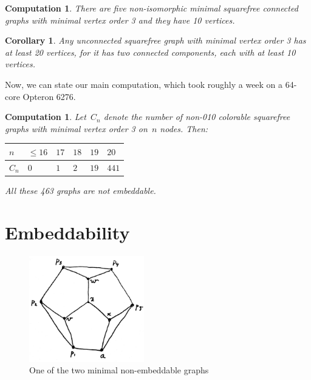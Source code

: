 \documentclass[a4paper]{article}
\newcounter{main}
\newtheorem{comp}[main]{Computation}
\newtheorem{cor}[main]{Corollary}
\theoremstyle{definition}
\theoremstyle{remark}
\begin{document}
\begin{comp}
    There are five non-isomorphic minimal
    squarefree connected graphs
    with minimal vertex order 3 and they have 10 vertices.
\end{comp}
\begin{cor}
    Any unconnected
    squarefree graph with minimal vertex order 3
    has at least 20 vertices, for it has two connected components,
    each with at least 10 vertices.
\end{cor}
Now, we can state our main computation, which took roughly a week
    on a 64-core Opteron 6276.
\begin{comp}
    Let~$C_n$ denote the number of non-010 colorable squarefree
    graphs with minimal vertex order 3 on~$n$ nodes.  Then:

    \begin{center}
    \begin{tabular}{l|lllll}
        $n$ & $\leq 16$
            & $17$
            & $18$
            & $19$
            & $20$ \\
        \hline
        $C_n$ & $0$
            & $1$
            & $2$
            & $19$
            & $441$
    \end{tabular}
    \end{center}

    All these 463 graphs are not embeddable.
\end{comp}


\section{Embeddability}
\label{sec:emb}
\begin{figure}
\begin{center}
\includegraphics[width=50mm]{graphs/unemb-10-2.jpg}
\end{center}
\caption{One of the two minimal
        non-embeddable graphs
\label{fig:unemb-10-2}}
\end{figure}
\end{document}
